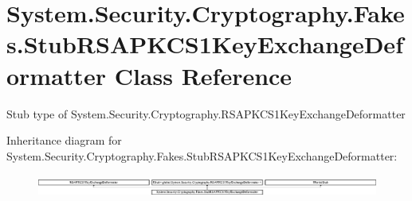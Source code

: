 \hypertarget{class_system_1_1_security_1_1_cryptography_1_1_fakes_1_1_stub_r_s_a_p_k_c_s1_key_exchange_deformatter}{\section{System.\-Security.\-Cryptography.\-Fakes.\-Stub\-R\-S\-A\-P\-K\-C\-S1\-Key\-Exchange\-Deformatter Class Reference}
\label{class_system_1_1_security_1_1_cryptography_1_1_fakes_1_1_stub_r_s_a_p_k_c_s1_key_exchange_deformatter}
}


Stub type of System.\-Security.\-Cryptography.\-R\-S\-A\-P\-K\-C\-S1\-Key\-Exchange\-Deformatter 


Inheritance diagram for System.\-Security.\-Cryptography.\-Fakes.\-Stub\-R\-S\-A\-P\-K\-C\-S1\-Key\-Exchange\-Deformatter\-:\begin{figure}[H]
\begin{center}
\leavevmode
\includegraphics[height=0.752688cm]{class_system_1_1_security_1_1_cryptography_1_1_fakes_1_1_stub_r_s_a_p_k_c_s1_key_exchange_deformatter}
\end{center}
\end{figure}
